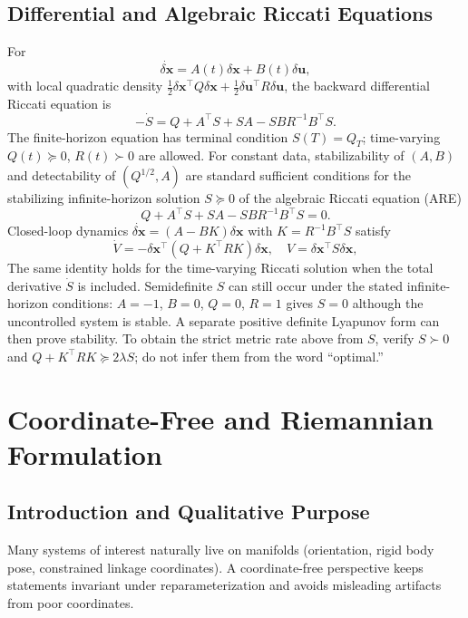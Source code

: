 \documentclass[11pt,letterpaper]{article}
\newcommand{\dx}{\delta\mathbf{x}}
\newcommand{\du}{\delta\mathbf{u}}
\begin{document}
\subsection{Differential and Algebraic Riccati Equations}
For
\begin{equation}
\dot{\dx} = A(t)\dx + B(t)\du,
\label{eq:ct-perturbation}
\end{equation}
with local quadratic density $\frac12\dx^\top Q\dx + \frac12\du^\top R\du$, the backward differential Riccati equation is
\begin{equation}
-\dot S = Q + A^\top S + SA - SBR^{-1}B^\top S.
\label{eq:dre}
\end{equation}
The finite-horizon equation has terminal condition $S(T)=Q_T$; time-varying $Q(t)\succeq0$, $R(t)\succ0$ are allowed. For constant data, stabilizability of $(A,B)$ and detectability of $(Q^{1/2},A)$ are standard sufficient conditions for the stabilizing infinite-horizon solution $S\succeq0$ of the algebraic Riccati equation (ARE) \citep{tedrake2026lqr}
\begin{equation}
Q + A^\top S + SA - SBR^{-1}B^\top S = 0.
\label{eq:are}
\end{equation}
Closed-loop dynamics $\dot{\dx} = (A-BK)\dx$ with $K=R^{-1}B^\top S$ satisfy
\begin{equation}
\dot V = -\dx^\top(Q+K^\top RK)\dx,
\quad V=\dx^\top S\dx,
\label{eq:ct-value-drop}
\end{equation}
The same identity holds for the time-varying Riccati solution when the total derivative $\dot S$ is included. Semidefinite $S$ can still occur under the stated infinite-horizon conditions: $A=-1$, $B=0$, $Q=0$, $R=1$ gives $S=0$ although the uncontrolled system is stable. A separate positive definite Lyapunov form can then prove stability. To obtain the strict metric rate above from $S$, verify $S\succ0$ and $Q+K^\top RK\succeq2\lambda S$; do not infer them from the word ``optimal.''

\section{Coordinate-Free and Riemannian Formulation}

\subsection{Introduction and Qualitative Purpose}
Many systems of interest naturally live on manifolds (orientation, rigid body pose, constrained linkage coordinates). A coordinate-free perspective keeps statements invariant under reparameterization and avoids misleading artifacts from poor coordinates.
\end{document}
